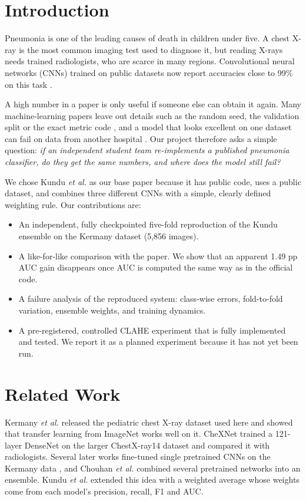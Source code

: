 \documentclass[conference]{IEEEtran}
\begin{document}
\section{Introduction}
Pneumonia is one of the leading causes of death in children under five. A chest X-ray is the most common imaging test used to diagnose it, but reading X-rays needs trained radiologists, who are scarce in many regions. Convolutional neural networks (CNNs) trained on public datasets now report accuracies close to 99\% on this task \cite{kermany,chexnet,kundu}.

A high number in a paper is only useful if someone else can obtain it again. Many machine-learning papers leave out details such as the random seed, the validation split or the exact metric code \cite{gundersen}, and a model that looks excellent on one dataset can fail on data from another hospital \cite{zech,roberts}. Our project therefore asks a simple question: \textit{if an independent student team re-implements a published pneumonia classifier, do they get the same numbers, and where does the model still fail?}

We chose Kundu \textit{et al.} \cite{kundu} as our base paper because it has public code, uses a public dataset, and combines three different CNNs with a simple, clearly defined weighting rule. Our contributions are:

\begin{itemize}
\item An independent, fully checkpointed five-fold reproduction of the Kundu ensemble on the Kermany dataset (5,856 images).
\item A like-for-like comparison with the paper. We show that an apparent 1.49 pp AUC gain disappears once AUC is computed the same way as in the official code.
\item A failure analysis of the reproduced system: class-wise errors, fold-to-fold variation, ensemble weights, and training dynamics.
\item A pre-registered, controlled CLAHE experiment that is fully implemented and tested. We report it as a planned experiment because it has not yet been run.
\end{itemize}

\section{Related Work}
Kermany \textit{et al.} \cite{kermany} released the pediatric chest X-ray dataset used here and showed that transfer learning from ImageNet \cite{imagenet} works well on it. CheXNet \cite{chexnet} trained a 121-layer DenseNet on the larger ChestX-ray14 dataset and compared it with radiologists. Several later works fine-tuned single pretrained CNNs on the Kermany data \cite{stephen,rahman}, and Chouhan \textit{et al.} \cite{chouhan} combined several pretrained networks into an ensemble. Kundu \textit{et al.} \cite{kundu} extended this idea with a weighted average whose weights come from each model's precision, recall, F1 and AUC.
\end{document}
